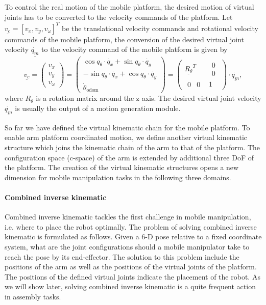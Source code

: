 To control the real motion of the mobile platform, the desired motion of virtual joints has to be converted to the velocity commands of the platform. Let $ \underline{v_{c}} = {[v_x, v_y, v_{\omega}]}^{T}$ be the translational velocity commands and rotational velocity commands of the mobile platform, the conversion of the desired virtual joint velocity $\dot{\underline{q_m}} $ to the velocity command of the mobile platform is given by 
\begin{equation}
    \underline {v_{c}} = 
	\begin{pmatrix}
	 v_x \\
	 v_y \\
	 v_{\omega}
	\end{pmatrix} 
	= 
	\begin{pmatrix}
	 \cos q_{\theta}\cdot \dot{q_x} +  \sin  q_{\theta} \cdot \dot{q_y} \\
	 -\sin q_{\theta} \cdot \dot{q_x} + \cos q_{\theta}   \cdot\dot{q_y} \\
	 \dot{\theta}_{\text{odom}}
	 \end{pmatrix} 
    =  
     \begin{pmatrix}
	    {\underline{R_{\theta}} } ^ T & \begin{matrix} 0 \\ 0 \end{matrix} \\
	    \begin{matrix} 0 & 0 \end{matrix} & 1    
    	 \end{pmatrix} 
    	  \cdot \dot{\underline{q_m}}     
	 ,
\label{equ:velocity_conversion}	 
\end{equation}
where $R_{\theta}$ is a rotation matrix around the z axis. The desired virtual joint velocity $\dot{\underline{q_m}} $ is usually the output of a motion generation module.

So far we have defined the virtual kinematic chain for the mobile platform. To enable arm platform coordinated motion, we define another virtual kinematic structure which joins the kinematic chain of the arm to that of the platform. The configuration space (c-space) of the arm is extended by additional three DoF of the platform. The creation of the virtual kinematic structures opens a new dimension for mobile manipulation tasks in the following three domains.  

\paragraph{Combined inverse kinematic}
Combined inverse kinematic tackles the first challenge in mobile manipulation, i.e. where to place the robot optimally. The problem of solving combined inverse kinematic is formulated as follows. Given a 6-D pose relative to a fixed coordinate system, what are the joint configurations should a mobile manipulator take to reach the pose by its end-effector. The solution to this problem include the positions of the arm as well as the positions of the virtual joints of the platform. The positions of the defined virtual joints indicate the placement of the robot. As we will show later, solving combined inverse kinematic is a quite frequent action in assembly tasks. 


